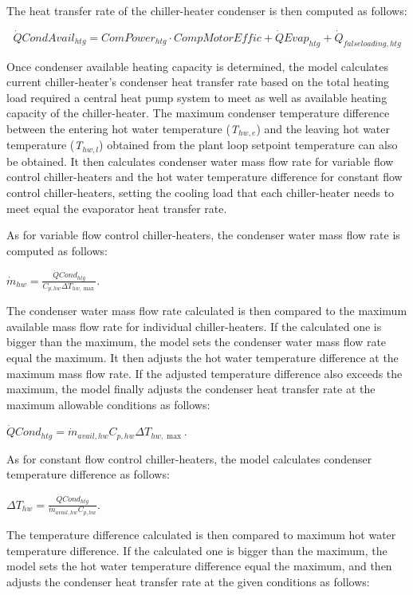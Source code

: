 The heat transfer rate of the chiller-heater condenser is then computed as follows:

\begin{equation}
\dot QCondAvai{l_{htg}} = ComPowe{r_{htg}} \cdot CompMotorEffic + \dot QEva{p_{htg}} + {\dot Q_{falseloading,htg}}
\end{equation}

Once condenser available heating capacity is determined, the model calculates current chiller-heater's condenser heat transfer rate based on the total heating load required a central heat pump system to meet as well as available heating capacity of the chiller-heater. The maximum condenser temperature difference between the entering hot water temperature (\emph{T\(_{hw,e}\)}) and the leaving hot water temperature (\emph{T\(_{hw,l}\)}) obtained from the plant loop setpoint temperature can also be obtained. It then calculates condenser water mass flow rate for variable flow control chiller-heaters and the hot water temperature difference for constant flow control chiller-heaters, setting the cooling load that each chiller-heater needs to meet equal the evaporator heat transfer rate.

As for variable flow control chiller-heaters, the condenser water mass flow rate is computed as follows:

\textbf{\emph{\({\dot m_{hw}} = \frac{{\dot QCon{d_{htg}}}}{{{C_{p,hw}}\Delta {T_{hw,\max }}}}\)}}.

The condenser water mass flow rate calculated is then compared to the maximum available mass flow rate for individual chiller-heaters. If the calculated one is bigger than the maximum, the model sets the condenser water mass flow rate equal the maximum. It then adjusts the hot water temperature difference at the maximum mass flow rate. If the adjusted temperature difference also exceeds the maximum, the model finally adjusts the condenser heat transfer rate at the maximum allowable conditions as follows:

\textbf{\emph{\(\dot QCon{d_{htg}} = {\dot m_{avail,hw}}{C_{p,hw}}\Delta {T_{hw,\max }}\)}}.

As for constant flow control chiller-heaters, the model calculates condenser temperature difference as follows:

\textbf{\emph{\(\Delta {T_{hw}} = \frac{{\dot QCon{d_{htg}}}}{{{{\dot m}_{avail,hw}}{C_{p,hw}}}}\)}}.

The temperature difference calculated is then compared to maximum hot water temperature difference. If the calculated one is bigger than the maximum, the model sets the hot water temperature difference equal the maximum, and then adjusts the condenser heat transfer rate at the given conditions as follows:

